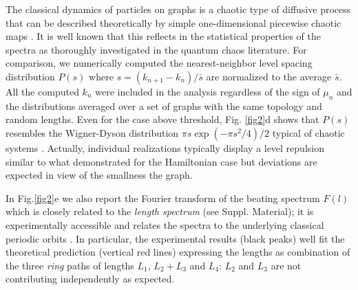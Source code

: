 \documentclass[aps,prl,twocolumn,showpacs,amsmath,amssymb,floatfix,superscriptaddress,
]{revtex4-1}
\begin{document}
The classical dynamics of particles on graphs is a chaotic type of diffusive process \cite{barra2001classical} that can be described theoretically by simple one-dimensional piecewise chaotic maps \cite{pakonski2001classical}. It is well known that this reflects 
in the statistical properties of the spectra as thoroughly investigated in the quantum chaos literature. For comparison, we numerically computed the nearest-neighbor level spacing distribution $P(s)$ where $s=(k_{n+1}-k_n)/\bar s$ are normalized to the average $\bar s$. All the computed $k_n$ were included in the analysis regardless of the sign of $\mu_n$ and the distributions averaged over a set of graphs with the same topology and random lengths. Even for the case above threshold,  Fig. \ref{fig2}d shows that $P(s)$ 
resembles the Wigner-Dyson distribution $\pi s\exp(-\pi s^2/4)/2$ typical of chaotic systems \cite{kottos1999periodic}. Actually, individual realizations typically 
display a level repulsion similar to what demonstrated for the Hamiltonian case \citep{barra2000level} but deviations are expected in view of the smallness the graph. 

In  Fig.\ref{fig2}e we also report the Fourier transform of the beating spectrum
$F(l)$ which is closely related to the {\it length spectrum} (see Suppl. Material); it is experimentally accessible and relates the spectra to the underlying classical periodic orbits \cite{hul2004experimental,kottos1999periodic}.
In particular, the experimental results (black peaks) well fit the theoretical prediction (vertical red lines) expressing the lengths as combination of the three {\it ring} paths of lengths $L_1$, $L_2+L_3$ and $L_4$: $L_2$ and $L_3$ are not contributing independently as expected.
\end{document}
